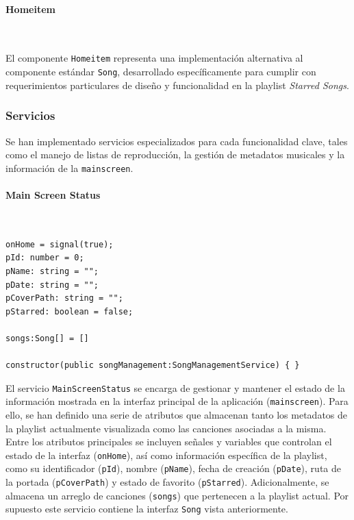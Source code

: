 \documentclass[11pt, a4paper]{article}
\begin{document}
                \paragraph{Homeitem}
                ‎

                El componente \verb|Homeitem| representa una implementación alternativa al componente estándar \verb|Song|, desarrollado específicamente para cumplir con requerimientos particulares de diseño y funcionalidad en la playlist \textit{Starred Songs}.

            \subsubsection{Servicios}

            Se han implementado servicios especializados para cada funcionalidad clave, tales como el manejo de listas de reproducción, la gestión de metadatos musicales y la información de la \verb|mainscreen|.

                \paragraph{Main Screen Status}
                ‎

                \begin{lstlisting}[caption={Atributos Main Screen Status}]
onHome = signal(true);
pId: number = 0;
pName: string = "";
pDate: string = "";
pCoverPath: string = "";
pStarred: boolean = false;

songs:Song[] = []

constructor(public songManagement:SongManagementService) { }
                \end{lstlisting}

                El servicio \verb|MainScreenStatus| se encarga de gestionar y mantener el estado de la información mostrada en la interfaz principal de la aplicación (\verb|mainscreen|). Para ello, se han definido una serie de atributos que almacenan tanto los metadatos de la playlist actualmente visualizada como las canciones asociadas a la misma. \\

                Entre los atributos principales se incluyen señales y variables que controlan el estado de la interfaz (\verb|onHome|), así como información específica de la playlist, como su identificador (\verb|pId|), nombre (\verb|pName|), fecha de creación (\verb|pDate|), ruta de la portada (\verb|pCoverPath|) y estado de favorito (\verb|pStarred|). Adicionalmente, se almacena un arreglo de canciones (\verb|songs|) que pertenecen a la playlist actual. Por supuesto este servicio contiene la interfaz \verb|Song| vista anteriormente. \\
\end{document}
